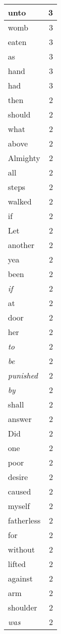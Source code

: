 \begin{center}
\begin{longtable}{l|r}
unto & 3 \\ \hline
womb & 3 \\ \hline
eaten & 3 \\ \hline
as & 3 \\ \hline
hand & 3 \\ \hline
had & 3 \\ \hline
then & 2 \\ \hline
should & 2 \\ \hline
what & 2 \\ \hline
above & 2 \\ \hline
Almighty & 2 \\ \hline
all & 2 \\ \hline
steps & 2 \\ \hline
walked & 2 \\ \hline
if & 2 \\ \hline
Let & 2 \\ \hline
another & 2 \\ \hline
yea & 2 \\ \hline
been & 2 \\ \hline
\emph{if} & 2 \\ \hline
at & 2 \\ \hline
door & 2 \\ \hline
her & 2 \\ \hline
\emph{to} & 2 \\ \hline
\emph{be} & 2 \\ \hline
\emph{punished} & 2 \\ \hline
\emph{by} & 2 \\ \hline
shall & 2 \\ \hline
answer & 2 \\ \hline
Did & 2 \\ \hline
one & 2 \\ \hline
poor & 2 \\ \hline
desire & 2 \\ \hline
caused & 2 \\ \hline
myself & 2 \\ \hline
fatherless & 2 \\ \hline
for & 2 \\ \hline
without & 2 \\ \hline
lifted & 2 \\ \hline
against & 2 \\ \hline
arm & 2 \\ \hline
shoulder & 2 \\ \hline
\emph{was} & 2 \\ \hline

\end{longtable}
\end{center}
